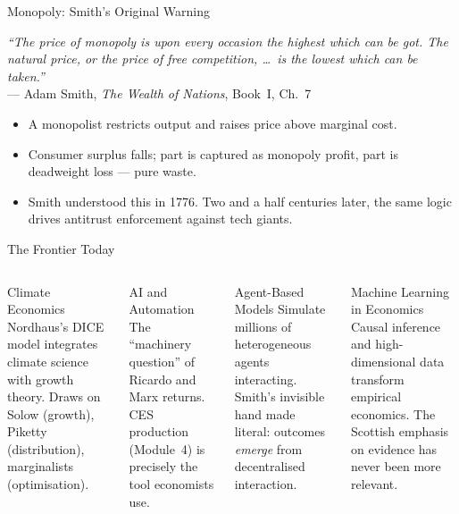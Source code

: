 \documentclass[aspectratio=169, 10pt]{beamer}
\begin{document}
\begin{frame}{Monopoly: Smith's Original Warning}
\begin{center}
\textit{``The price of monopoly is upon every occasion the highest
which can be got. The natural price, or the price of free competition,
\ldots\ is the lowest which can be taken.''}\\[4pt]
--- Adam Smith, \textit{The Wealth of Nations}, Book~I, Ch.~7
\end{center}
\vspace{0.5em}
\begin{itemize}
  \item A monopolist restricts output and raises price above marginal cost.
  \item Consumer surplus falls; part is captured as monopoly profit,
        part is \alert{deadweight loss} --- pure waste.
  \item Smith understood this in 1776. Two and a half centuries later,
        the same logic drives antitrust enforcement against tech giants.
\end{itemize}
\end{frame}

\begin{frame}{The Frontier Today}
\begin{columns}[T]
\begin{block}{Climate Economics}
Nordhaus's DICE model integrates climate science with growth theory.
Draws on Solow (growth), Piketty (distribution), marginalists
(optimisation).
\end{block}
\vspace{0.3em}
\begin{block}{AI and Automation}
The ``machinery question'' of Ricardo and Marx returns. CES production
(Module~4) is precisely the tool economists use.
\end{block}
\begin{block}{Agent-Based Models}
Simulate millions of heterogeneous agents interacting. Smith's invisible
hand made literal: outcomes \textit{emerge} from decentralised
interaction.
\end{block}
\vspace{0.3em}
\begin{block}{Machine Learning in Economics}
Causal inference and high-dimensional data transform empirical economics.
The Scottish emphasis on evidence has never been more relevant.
\end{block}
\end{columns}
\end{frame}
\end{document}

